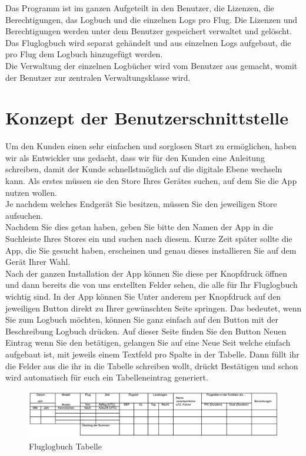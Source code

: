\documentclass[a4paper]{article} %
\begin{document}
    \noindent Das Programm ist im ganzen Aufgeteilt in den Benutzer, die Lizenzen, die Berechtigungen, das Logbuch und die einzelnen Logs pro Flug. Die Lizenzen und Berechtigungen werden unter dem Benutzer gespeichert verwaltet und gelöscht. Das Fluglogbuch wird separat gehändelt und aus einzelnen Logs aufgebaut, die pro Flug dem Logbuch hinzugefügt werden.\\ Die Verwaltung der einzelnen Logbücher wird vom Benutzer aus gemacht, womit der Benutzer zur zentralen Verwaltungsklasse wird.

    \section{Konzept der Benutzerschnittstelle}
    \vspace{1cm}
    Um den Kunden einen sehr einfachen und sorglosen Start zu ermöglichen, haben wir als Entwickler uns gedacht, dass wir für den Kunden eine Anleitung schreiben, damit der Kunde schnellstmöglich auf die digitale Ebene wechseln kann. Als erstes müssen sie den Store Ihres Gerätes suchen, auf dem Sie die App nutzen wollen.\\ Je nachdem welches Endgerät Sie besitzen, müssen Sie den jeweiligen Store aufsuchen.\\ Nachdem Sie dies getan haben, geben Sie bitte den Namen der App in die Suchleiste Ihres Stores ein und suchen nach diesem. Kurze Zeit später sollte die App, die Sie gesucht haben, erscheinen und genau dieses installieren Sie auf dem Gerät Ihrer Wahl. \\Nach der ganzen Installation der App können Sie diese per Knopfdruck öffnen und dann bereits die von uns erstellten Felder sehen, die alle für Ihr Fluglogbuch wichtig sind. In der App können Sie Unter anderem per Knopfdruck auf den jeweiligen Button direkt zu Ihrer gewünschten Seite springen. Das bedeutet, wenn Sie zum Logbuch möchten, können Sie ganz einfach auf den Button mit der Beschreibung \glqq{}Logbuch\grqq{} drücken. Auf dieser Seite finden Sie den Button \glqq{}Neuen Eintrag\grqq{} wenn Sie den betätigen, gelangen Sie auf eine Neue Seit welche einfach aufgebaut ist, mit jeweils einem Textfeld pro Spalte in der Tabelle. Dann füllt ihr die Felder aus die ihr in die Tabelle schreiben wollt, drückt Bestätigen und schon wird automatisch für euch ein Tabelleneintrag generiert. \\
    \begin{figure}[h!]
        \centering
        \includegraphics[width=17cm]{Logbuch.png}
        \caption{Fluglogbuch Tabelle}
        \label{fig:my_label}
    \end{figure}
    
\end{document}
